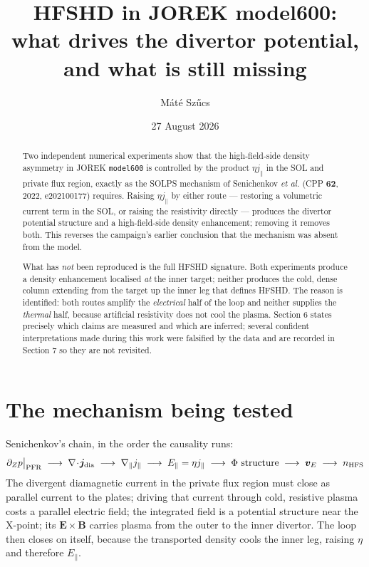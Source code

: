 \documentclass[11pt,a4paper]{article}
\title{\vspace{-1.5cm}HFSHD in JOREK model600: what drives the divertor potential,\\
       and what is still missing}
\author{Máté Szűcs}
\date{27 August 2026}
\newcommand{\code}[1]{\texttt{\small #1}}
\newcommand{\jpar}{j_\parallel}
\newcommand{\vE}{\bm v_E}
\begin{document}
\maketitle

\begin{abstract}
\noindent
Two independent numerical experiments show that the high-field-side density asymmetry in
JOREK \code{model600} is controlled by the product $\eta\jpar$ in the SOL and private flux
region, exactly as the SOLPS mechanism of Senichenkov \emph{et al.} (CPP \textbf{62}, 2022,
e202100177) requires. Raising $\eta\jpar$ by either route --- restoring a volumetric current
term in the SOL, or raising the resistivity directly --- produces the divertor potential
structure and a high-field-side density enhancement; removing it removes both. This
reverses the campaign's earlier conclusion that the mechanism was absent from the model.

What has \emph{not} been reproduced is the full HFSHD signature. Both experiments produce a
density enhancement localised \emph{at} the inner target; neither produces the cold, dense
column extending from the target up the inner leg that defines HFSHD. The reason is
identified: both routes amplify the \emph{electrical} half of the loop and neither supplies
the \emph{thermal} half, because artificial resistivity does not cool the plasma. Section 6
states precisely which claims are measured and which are inferred; several confident
interpretations made during this work were falsified by the data and are recorded in
Section 7 so they are not revisited.
\end{abstract}

\section{The mechanism being tested}

Senichenkov's chain, in the order the causality runs:
\begin{equation}
  \partial_Z p \big|_{\rm PFR}
  \;\longrightarrow\;
  \nabla\!\cdot\!\bm j_{\rm dia}
  \;\longrightarrow\;
  \nabla_\parallel \jpar
  \;\longrightarrow\;
  E_\parallel = \eta\jpar
  \;\longrightarrow\;
  \Phi\ \text{structure}
  \;\longrightarrow\;
  \vE
  \;\longrightarrow\;
  n_{\rm HFS}
  \label{eq:chain}
\end{equation}
The divergent diamagnetic current in the private flux region must close as parallel current
to the plates; driving that current through cold, resistive plasma costs a parallel electric
field; the integrated field is a potential structure near the X-point; its $\bm E\times\bm B$
carries plasma from the outer to the inner divertor. The loop then closes on itself, because
the transported density cools the inner leg, raising $\eta$ and therefore $E_\parallel$.
\end{document}
